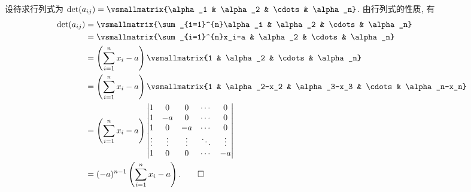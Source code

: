 \begin{solution}
    设待求行列式为 \(\det(a_{ij})=\vsmallmatrix{\alpha_1 & \alpha_2 & \cdots & \alpha_n}\).
    由行列式的性质, 有
    \begin{align*}
        \det(a_{ij})&=\vsmallmatrix{\sum_{i=1}^{n}\alpha_i & \alpha_2 & \cdots & \alpha_n}\\
        &=\vsmallmatrix{\sum_{i=1}^{n}x_i-a & \alpha_2 & \cdots & \alpha_n}\\
        &=\p{\sum_{i=1}^{n}x_i-a}\vsmallmatrix{1 & \alpha_2 & \cdots & \alpha_n}\\
        &=\p{\sum_{i=1}^{n}x_i-a}\vsmallmatrix{1 & \alpha_2-x_2 & \alpha_3-x_3 & \cdots & \alpha_n-x_n}\\
        &=\p{\sum_{i=1}^{n}x_i-a}
        \begin{vmatrix}
            1 & 0 & 0 & \cdots & 0\\
            1 & -a & 0 & \cdots & 0\\
            1 & 0 & -a & \cdots & 0\\
            \vdots & \vdots & \vdots & \ddots & \vdots\\
            1 & 0 & 0 & \cdots & -a
        \end{vmatrix}\\
        &=(-a)^{n-1}\p{\sum_{i=1}^{n}x_i-a}.\qedhere
    \end{align*}
\end{solution}